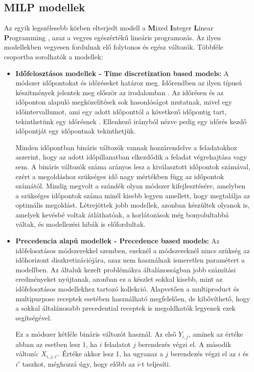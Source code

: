 \subsection{MILP modellek}
Az egyik legszélesebb körben elterjedt modell a \textbf{M}ixed \textbf{I}nteger \textbf{L}inear \textbf{P}rogramming \cite{Mendez2006} \cite{Floudas2004}, azaz a vegyes egészértékű lineáris programozás.
Az ilyen modellekben vegyesen fordulnak elő folytonos és egész változók. Többféle csoportba sorolhatók a modellek:
\begin{itemize}
  \item[] \textbf{Időfelosztásos modellek - Time discretization based models:}
  A módszer időpontokat és időréseket határoz meg.
  Időrendben az ilyen típusú készítmények jelentek meg először az irodalomban \cite{kondili}.
  Az időrésen és az időponton alapuló megközelítések sok hasonlóságot mutatnak, mivel egy időintervallumot, ami egy adott időponttól a következő időpontig tart, tekinthetünk egy időrésnek \cite{susarla}.
  Ellenkező irányból nézve pedig egy időrés kezdő időpontját egy időpontnak tekinthetjük.  
  
Minden időpontban bináris változók vannak hozzárendelve a feladatokhoz aszerint, hogy az adott időpillanatban elkezdődik a feladat végrehajtása vagy sem.
A bináris változók száma arányos lesz a kiválasztott időpontok számával, ezért a megoldáshoz szükséges idő nagy mértékben függ az időpontok számától.
Mindig megvolt a szándék olyan módszer kifejlesztésére, amelyben a szükséges időpontok száma minél kisebb legyen amellett, hogy megtalálja az optimális megoldást.
Létrejöttek jobb modellek, azonban készültek olyanok is, amelyek kevésbé voltak átláthatóak, a korlátozások még bonyolultabbá váltak, és modellezési hibák is előfordultak.
  
  \item[] \textbf{Precedencia alapú modellek - Precedence based models:}
  Az időfelosztásos módszerekkel szemben, ezeknél a módszereknél nincs szükség az időhorizont diszkretizációjára, azaz nem használnak ismeretlen paramétert a modellben.
  Az általuk kezelt problémákra általánosságban jobb számítási eredményeket nyújtanak, azonban ez a készlet sokkal kisebb, mint az időfelosztásos modellekhez tartozó kollekció.
  Alapvetően a multiproduct és multipurpose receptek esetében használható megfelelően, de kibővíthető, hogy a sokkal általánosabb precedential receptek is megoldhatók legyenek ezek segítségével. 
  
Ez a módszer kétféle bináris változót használ.
Az első $Y_{i,j}$, aminek az értéke abban az esetben lesz 1, ha $i$ feladatot $j$ berendezés végzi el.
A második változó: $X_{i,j,i'}$.
Értéke akkor lesz 1, ha ugyanaz a $j$ berendezés végzi el az $i$ és $i'$ taszkot, méghozzá úgy, hogy előbb az $i$-t teljesíti. 
\end{itemize}

